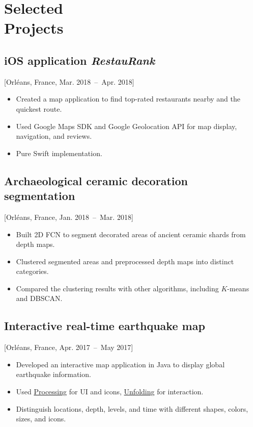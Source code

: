 \documentclass{mycv}
\begin{document}
\section{Selected \\ Projects}

\subsection{iOS application \textit{RestauRank}}[Orl\'eans, France, Mar. 2018~--~Apr. 2018]

\begin{itemize}
  \itemsep 0em
  \item Created a map application to find top-rated restaurants nearby and the quickest route.
  \item Used Google Maps SDK and Google Geolocation API for map display, navigation, and reviews.
  \item Pure Swift implementation.
\end{itemize}

\subsection{Archaeological ceramic decoration segmentation}[Orl\'eans, France, Jan. 2018~--~Mar. 2018]

\begin{itemize}
  \itemsep 0em
    \item Built 2D FCN to segment decorated areas of ancient ceramic shards from depth maps.
    \item Clustered segmented areas and preprocessed depth maps into distinct categories.
    \item Compared the clustering results with other algorithms, including $K$-means and DBSCAN.
\end{itemize}

\subsection{Interactive real-time earthquake map}[Orl\'eans, France, Apr. 2017~--~May 2017]

\begin{itemize}
  \item Developed an interactive map application in Java to display global earthquake information.
  \item Used \href{https://processing.org/}{Processing} for UI and icons, \href{http://unfoldingmaps.org/}{Unfolding} for interaction.
  \item Distinguish locations, depth, levels, and time with different shapes, colors, sizes, and icons.
\end{itemize}
\end{document}
